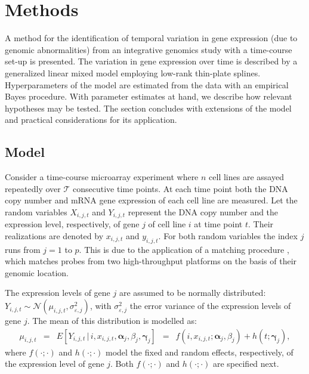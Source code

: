 \section{Methods}
A method for the identification of temporal variation in gene expression (due to genomic abnormalities) from an integrative genomics study with a time-course set-up is presented. The variation in gene expression over time is described by a generalized linear mixed model employing low-rank thin-plate splines. Hyperparameters of the model are estimated from the data with an empirical Bayes procedure. With parameter estimates at hand, we describe how relevant hypotheses may be tested. The section concludes with extensions of the model and practical considerations for its application.

\subsection{Model}
\label{model}
Consider a time-course microarray experiment where $n$ cell lines are assayed repeatedly over $\mathcal{T}$ consecutive time points. At each time point both the DNA copy number and mRNA gene expression of each cell line are measured. Let the random variables $X_{i, j, t}$ and $Y_{i, j, t}$ represent the DNA copy number and the expression level, respectively, of gene $j$ of cell line $i$ at time point $t$. Their realizations are denoted by $x_{i,j,t}$ and $y_{i,j,t}$. For both random variables the index $j$ runs from $j=1$ to $p$. This is due to the application of a matching procedure \cite{Wieringen2012}, which matches probes from two high-throughput platforms on the basis of their genomic location.

The expression levels of gene $j$ are assumed to be normally distributed: $Y_{i,j,t} \sim \mathcal{N}(\mu_{i, j,t}, \sigma_{\varepsilon,j}^2)$, with $\sigma_{\varepsilon,j}^2$ the error variance of the expression levels of gene $j$. The mean of this distribution is modelled as:
\begin{eqnarray} \label{form.originalModel}
\mu_{i,j,t} & = & E[Y_{i,j,t} \, | \, i, x_{i,j,t}, \boldsymbol{\alpha}_j, \beta_j,\boldsymbol{\gamma}_j] \, \, \, = \, \, \,
f (i, x_{i,j,t}; \boldsymbol{\alpha}_j, \beta_j) + h(t;\boldsymbol{\gamma}_j),
\end{eqnarray}
where $f(\cdot; \cdot)$ and $h(\cdot;\cdot)$ model the fixed and random effects, respectively, of the expression level of gene $j$. Both $f(\cdot; \cdot)$ and $h(\cdot;\cdot)$ are specified next.

